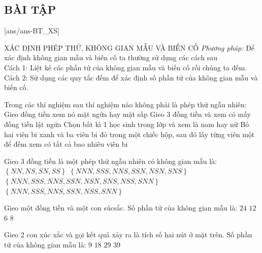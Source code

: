 \subsection{BÀI TẬP}
[ans/ans-BT_XS]
\begin{dang}{XÁC ĐỊNH PHÉP THỬ, KHÔNG GIAN MẪU VÀ BIẾN CỐ}
\textit{Phương pháp:} Để xác định không gian mẫu và biến cố ta thường sử dụng các cách sau\\
Cách 1: Liệt kê các phần tử của không gian mẫu và biến cố rồi chúng ta đếm.\\
Cách 2: Sử dụng các quy tắc đếm để xác định số phần tử của không gian mẫu và biến cố.\\
\end{dang}
\begin{ex}
Trong các thí nghiệm sau thí nghiệm nào không phải là phép thử ngẫu nhiên:
\choice
{Gieo đồng tiền xem nó mặt ngửa hay mặt sấp}
{Gieo $3$ đồng tiền và xem có mấy đồng tiền lật ngửa}
{Chọn bất kì 1 học sinh trong lớp và xem là nam hay nữ}
{\True Bỏ hai viên bi xanh và ba viên bi đỏ trong một chiếc hộp, sau đó lấy từng viên một để đếm xem có tất cả bao nhiêu viên bi}
\end{ex}
\begin{ex}
Gieo 3 đồng tiền là một phép thử ngẫu nhiên có không gian mẫu là:
\choice
{$\left\{ NN,NS,SN,SS \right\}$}
{$\left\{ NNN, SSS, NNS, SSN, NSN, SNS \right\}$}
{\True $\left\{ NNN,SSS,NNS,SSN,NSN,SNS,NSS,SNN \right\}$}
{$\left\{ NNN,SSS,NNS,SSN,NSS,SNN \right\}$}
\end{ex}
\begin{ex}
Gieo một đồng tiền và một con súcsắc. Số phần tử của không gian mẫu là:
\choice
{$24$}
{\True $12$}
{$6$}
{$8$}
\end{ex}
\begin{ex}
Gieo 2 con xúc xắc và gọi kết quả xảy ra là tích số hai nút ở mặt trên. Số phần tử của không gian mẫu là:
\choice
{$9$}
{\True $18$}
{$29$}
{$39$}
\end{ex}
